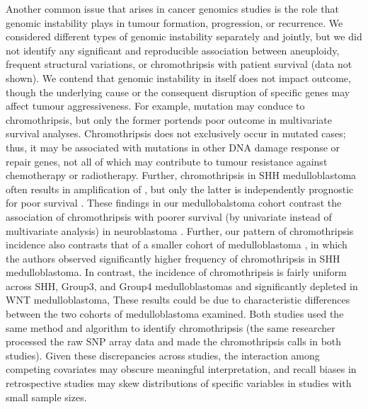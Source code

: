 Another common issue that arises in cancer genomics studies is the role that genomic instability plays in tumour formation, progression, or recurrence. We considered different types of genomic instability separately and jointly, but we did not identify any significant and reproducible association between aneuploidy, frequent structural variations, or chromothripsis with patient survival (data not shown). We contend that genomic instability in itself does not impact outcome, though the underlying cause or the consequent disruption of specific genes may affect tumour aggressiveness. For example,  mutation may conduce to chromothripsis, but only the former portends poor outcome in multivariate survival analyses. Chromothripsis does not exclusively occur in  mutated cases; thus, it may be associated with mutations in other DNA damage response or repair genes, not all of which may contribute to tumour resistance against chemotherapy or radiotherapy. Further, chromothripsis in SHH medulloblastoma often results in amplification of , but only the latter is independently prognostic for poor survival . These findings in our medullobalstoma cohort contrast the association of chromothripsis with poorer survival (by univariate instead of multivariate analysis) in neuroblastoma . Further, our pattern of chromothripsis incidence also contrasts that of a smaller cohort of medulloblastoma , in which the authors observed significantly higher frequency of chromothripsis in SHH medulloblastoma. In contrast, the incidence of chromothripsis is fairly uniform across SHH, Group3, and Group4 medulloblastomas and significantly depleted in WNT medulloblastoma, These results could be due to characteristic differences between the two cohorts of medulloblastoma examined. Both studies used the same method and algorithm to identify chromothripsis (the same researcher processed the raw SNP array data and made the chromothripsis calls in both studies). Given these discrepancies across studies, the interaction among competing covariates may obscure meaningful interpretation, and recall biases in retrospective studies may skew distributions of specific variables in studies with small sample sizes.

